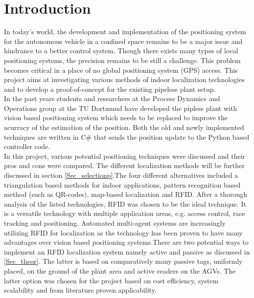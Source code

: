 \section{Introduction}

In today\textquoteright s world, the development and implementation of the positioning system for the autonomous vehicle in a confined space remains to be a major issue and hindrance to a better control system. Though there exists many types of local positioning systems, the precision remains to be still a challenge. This problem becomes critical in a place of no global positioning system (GPS) access. This project aims at investigating various methods of indoor localization technologies and to develop a proof-of-concept for the existing pipeless plant setup. \\

In the past years students and researchers at the Process Dynamics and Operations group at the TU Dortmund have developed the pipless plant with vision based positioning system which needs to be replaced to improve the acurracy of the estimation of the position. Both the old and newly implemented techniques are written in C\# that sends the position update to the Python based controller code.\\

In this project, various potential positioning techniques were discussed and their pros and cons were compared. The different localization methods will be further discussed in section \ref{Sec_selectionp}.The  four different alternatives included a triangulation based methods for indoor applications, pattern recognition based method (such as QR-codes), map-based localization and RFID. After a thorough analysis of the listed technologies, RFID was chosen to be the ideal technique. It is a versatile technology with multiple application areas, e.g. access control, race tracking and positioning. Automated multi-agent systems are increasingly utilizing RFID for localization as the technology has been proven to have many advantages over vision based positioning systems.There are two potential ways to implement an RFID localization system namely active and passive as discussed in \ref{Sec_theor}. The latter is based on comparatively many passive tags, uniformly placed, on the ground of the plant area and active readers on the AGVs. The latter option was chosen for the project based on cost efficiency, system scalability and from literature proven applicability. \\

